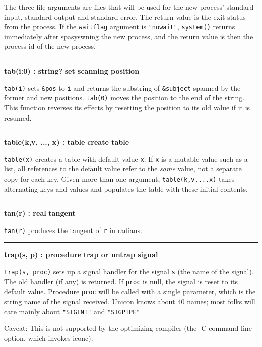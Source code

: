 The three file arguments are files that will be used for the new
process' standard input, standard output and standard
error. The return value is the exit status from the process. If the
\texttt{waitflag} argument is
\texttt{"nowait"}, \texttt{system()}
returns immediately after spasyswning the new process, and the return
value is then the process id of the new process.

\bigskip\hrule\vspace{0.1cm}
\noindent
{\bf tab(i:0) : string? } \hfill {\bf set scanning position}

\noindent
{}\texttt{tab(i)} sets \texttt{\&pos} to \texttt{i} and
returns the substring of \texttt{\&subject} spanned by the former and
new positions. \texttt{tab(0)} moves the position to the end of the
string. This function reverses its effects by resetting the position to
its old value if it is resumed.

\bigskip\hrule\vspace{0.1cm}
\noindent
{\bf table(k,v, ..., x) : table } \hfill {\bf create table}

\noindent
{}\texttt{table(x)} creates a table with default value
\texttt{x}. If \texttt{x} is a mutable value such as a list, all
references to the default value refer to the \textit{same} value, not a
separate copy for each key. Given more than one argument,
\texttt{table(k,v,...x)} takes alternating keys and values and
populates the table with these initial contents.

\bigskip\hrule\vspace{0.1cm}
\noindent
{\bf tan(r) : real } \hfill {\bf tangent}

\noindent
{}\texttt{tan(r)} produces the tangent of \texttt{r} in
radians.

\bigskip\hrule\vspace{0.1cm}
\noindent
{\bf trap(s, p) : procedure } \hfill {\bf trap or untrap signal}

\noindent
{}\texttt{trap(s, proc)} sets up a signal handler for
the signal \texttt{s} (the name of the signal). The old handler (if
any) is returned. If \texttt{proc} is null, the signal is reset to its
default value. Procedure \texttt{proc} will be called with a single parameter,
which is the string name of the signal received. Unicon knows about 40
names; most folks will care mainly about
\texttt{"SIGINT"} and \texttt{"SIGPIPE"}.

Caveat: This is not supported by the optimizing
compiler (the -C command line option, which invokes iconc).

